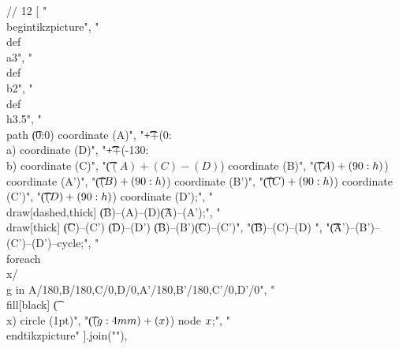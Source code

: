 // 12
[
"\\begin{tikzpicture}",
"\t\\def\\a{3}",
"\t\\def\\b{2}",
"\t\\def\\h{3.5}",
"\t\\path \t(0:0) coordinate (A)",
"\t\t\t++(0:\\a) coordinate (D)",
"\t\t\t++(-130:\\b) coordinate (C)",
"\t\t\t($(A)+(C)-(D)$) coordinate (B)",
"\t\t\t($(A)+(90:\\h)$) coordinate (A')",
"\t\t\t($(B)+(90:\\h)$) coordinate (B')",
"\t\t\t($(C)+(90:\\h)$) coordinate (C')",
"\t\t\t($(D)+(90:\\h)$) coordinate (D');",
"\t\\draw[dashed,thick] \t(B)--(A)--(D)\t(A)--(A');",
"\t\\draw[thick] \t(C)--(C') \t(D)--(D') \t(B)--(B')\t(C)--(C')",
"\t\t\t(B)--(C)--(D) ",
"\t\t\t(A')--(B')--(C')--(D')--cycle;",
"\t\\foreach \\x/\\g in {A/180,B/180,C/0,D/0,A'/180,B'/180,C'/0,D'/0}",
"\t\\fill[black] \t(\\x) circle (1pt)",
"\t($(\\g:4mm)+(\\x)$) node {$\\x$};",
"\\end{tikzpicture}"
].join("\n"),

